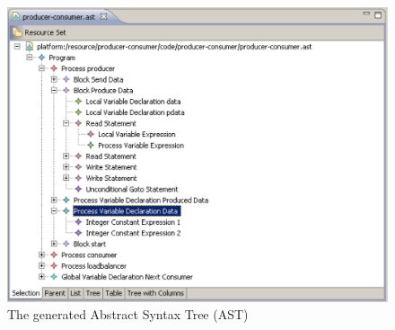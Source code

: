 \begin{figure}[b!]
\centering
\includegraphics[scale=0.2]{techniques_and_tool/graphics/ast.eps}
\caption{The generated Abstract Syntax Tree (AST)}
\label{fig:cgast}
\end{figure}

%

